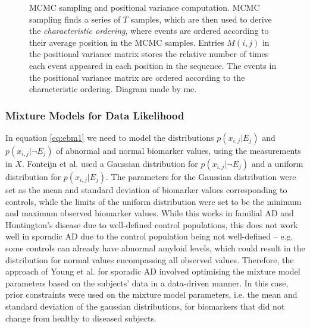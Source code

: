 \begin{figure}
\caption[Event-based model - MCMC sampling diagram]{MCMC sampling and positional variance computation. MCMC sampling finds a series of $T$ samples, which are then used to derive the \emph{characteristic ordering}, where events are ordered according to their average position in the MCMC samples. Entries $M(i,j)$ in the positional variance matrix stores the relative number of times each event appeared in each position in the sequence. The events in the positional variance matrix are ordered according to the characteristic ordering.  Diagram made by me.}
\label{fig:bckEbmMcmc}
\end{figure}

\subsubsection{Mixture Models for Data Likelihood}
\label{sec:mix_models}

In equation \ref{eq:ebm1} we need to model the distributions $p\left(x_{i,j} | E_{j} \right)$ and $p\left(x_{i,j} | \neg E_{j}\right)$ of abnormal and normal biomarker values, using the measurements in $X$. Fonteijn et al. \cite{fonteijn2012event} used a Gaussian distribution for $p\left(x_{i,j} | \neg E_{j}\right)$ and a uniform distribution for $p\left(x_{i,j} | E_{j} \right)$. The parameters for the Gaussian distribution were set as the mean and standard deviation of biomarker values corresponding to controls, while the limits of the uniform distribution were set to be the minimum and maximum observed biomarker values. While this works in familial AD and Huntington's disease \cite{fonteijn2012event} due to well-defined control populations, this does not work well in sporadic AD due to the control population being not well-defined -- e.g. some controls can already have abnormal amyloid levels, which could result in the distribution for normal values encompassing all observed values. Therefore, the approach of Young et al. \cite{young2014data} for sporadic AD involved optimising the mixture model parameters based on the subjects' data in a data-driven manner. In this case, prior constraints were used on the mixture model parameters, i.e. the mean and standard deviation of the gaussian distributions, for biomarkers that did not change from healthy to diseased subjects.


